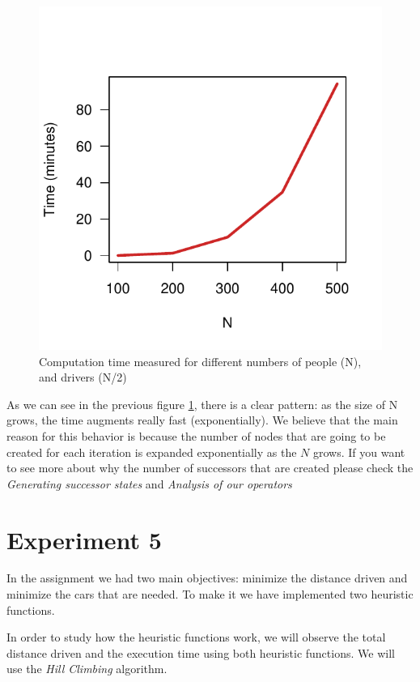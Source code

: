 \documentclass[12]{article}
\begin{document}
\begin{figure}[H]
\centering
\includegraphics[scale=0.8]{Results/data_4_1.pdf}
\caption{Computation time measured for different numbers of people (N), and drivers (N/2)}
\label{timedifferentN}
\end{figure}
\vspace{1cm}

As we can see in the previous figure \ref{timedifferentN}, there is a clear pattern: as the size of N grows, the time augments really fast (exponentially). We believe that the main reason for this behavior is because the number of nodes that are going to be created for each iteration is expanded exponentially as the $N$ grows. If you want to see more about why the number of successors that are created please check the \textit{Generating successor states} and \textit{Analysis of our operators}


\section{Experiment 5}
In the assignment we had two main objectives: minimize the distance driven and minimize the cars that are needed. To make it we have implemented two heuristic functions. 

In order to study how the heuristic functions work, we will observe the total distance driven and the execution time using both heuristic functions. We will use the \textit{Hill Climbing} algorithm.
\end{document}
